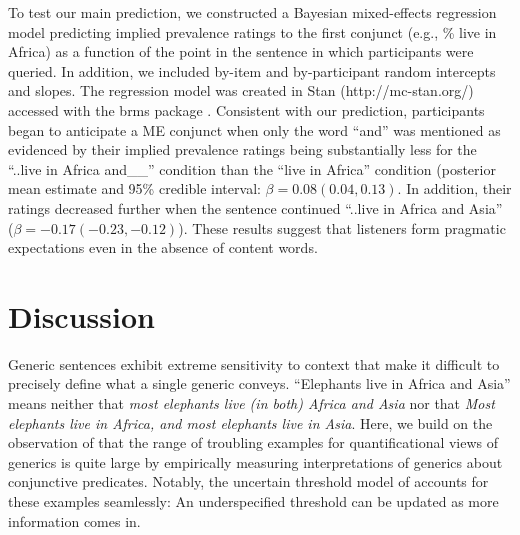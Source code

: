 \documentclass[10pt,letterpaper]{article}
\begin{document}
To test our main prediction, we constructed a Bayesian mixed-effects regression model predicting implied prevalence ratings to the first conjunct (e.g., \% live in Africa) as a function of the point in the sentence in which participants were queried. 
In addition, we included by-item and by-participant random intercepts and slopes. 
The regression model was created in Stan (http://mc-stan.org/) accessed with the brms package \cite{burkner_brms_2017}.
Consistent with our prediction, participants began to anticipate a ME conjunct when only the word ``and'' was mentioned as evidenced by their implied prevalence ratings being substantially less for the ``..live in Africa and\_\_'' condition than the ``live in Africa'' condition (posterior mean estimate and 95\% credible interval: $\beta = 0.08 (0.04, 0.13)$.
In addition, their ratings decreased further when the sentence continued ``..live in Africa and Asia'' ($\beta = -0.17 (-0.23, -0.12)$).
These results suggest that listeners form pragmatic expectations even in the absence of content words. 


\section{Discussion}

Generic sentences exhibit extreme sensitivity to context that make it difficult to precisely define what a single generic conveys. 
``Elephants live in Africa and Asia'' means neither that \emph{most elephants live (in both) Africa and Asia} nor that \emph{Most elephants live in Africa, and most elephants live in Asia}.
Here, we build on the observation of  that the range of troubling examples for quantificational views of generics is quite large by empirically measuring interpretations of generics about conjunctive predicates.  
Notably, the uncertain threshold model of  accounts for these examples seamlessly: An underspecified threshold can be updated as more information comes in. 
\end{document}

